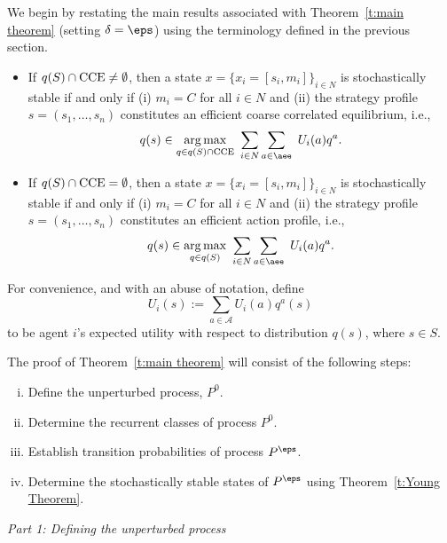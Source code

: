 We begin by restating the main results associated with Theorem~\ref{t:main theorem} (setting $\delta = \eps$) using the terminology defined in the previous section.  
%
\begin{itemize}%
%
\item If $q(S) \cap {\rm CCE} \neq \emptyset$, then a state $x=\{x_i = [s_i, m_i] \}_{i \in N}$ is stochastically stable if and only if (i) $m_i = C$ for all $i \in N$ and (ii) the strategy profile $s = (s_1, \dots, s_n)$ constitutes an efficient coarse correlated equilibrium, i.e., 
%
\begin{equation}\label{e:SS1}
q(s) \in \underset{ q \in q(S) \cap {\rm CCE}}{\arg \max} \ \sum_{i \in N} \sum_{a \in \aee} \ U_i(a) q^a. 
\end{equation}
%
%
\item If $q(S) \cap {\rm CCE} = \emptyset$, then a state $x=\{x_i = [s_i, m_i] \}_{i \in N}$ is stochastically stable if and only if (i) $m_i = C$ for all $i \in N$ and (ii) the strategy profile $s = (s_1, \dots, s_n)$ constitutes an efficient action profile, i.e., 
%
\begin{equation}\label{e:SS2} 
q(s) \in \underset{ q \in q(S)}{\arg \max} \ \sum_{i \in N} \sum_{a \in \aee} \ U_i(a) q^a. 
\end{equation} 
%
\end{itemize}

\noindent For convenience, and with an abuse of notation, define
\begin{equation}
U_i(s) := \sum_{a\in \mathcal{A}}U_i(a)q^a(s)
\end{equation}
to be agent $i$'s expected utility with respect to distribution $q(s)$, where $s\in S.$

The proof of Theorem~\ref{t:main theorem} will consist of the following steps:
%
\begin{enumerate}[(i)]
\item Define the unperturbed process, $P^0$.
\item Determine the recurrent classes of process $P^0$.   
\item Establish transition probabilities of process $P^\eps$.
\item Determine the stochastically stable states of $P^\eps$ using Theorem~\ref{t:Young Theorem}.
\end{enumerate}

\vspace{.2cm}
\noindent \emph{Part 1:  Defining the unperturbed process}
\vspace{.2cm}

